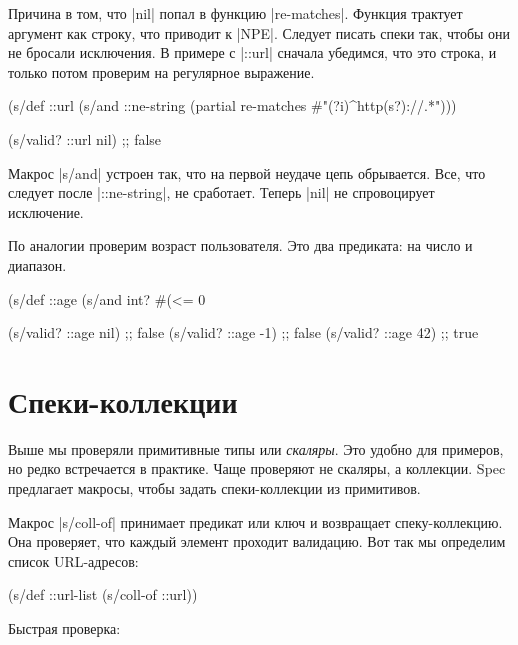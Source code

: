Причина в том, что \spverb|nil| попал в функцию \spverb|re-matches|. Функция
трактует аргумент как строку, что приводит к \spverb|NPE|. Следует писать спеки
так, чтобы они не бросали исключения. В примере с \spverb|::url| сначала
убедимся, что это строка, и только потом проверим на регулярное выражение.

\begin{english}
  \begin{clojure}
(s/def ::url
  (s/and ::ne-string
         (partial re-matches #"(?i)^http(s?)://.*")))

(s/valid? ::url nil) ;; false
  \end{clojure}
\end{english}

Макрос \spverb|s/and| устроен так, что на первой неудаче цепь обрывается. Все,
что следует после \spverb|::ne-string|, не сработает. Теперь \spverb|nil| не
спровоцирует исключение.

По аналогии проверим возраст пользователя. Это два предиката: на число и
диапазон.

\begin{english}
  \begin{clojure}
(s/def ::age
  (s/and int? #(<= 0 %

(s/valid? ::age nil) ;; false
(s/valid? ::age -1)  ;; false
(s/valid? ::age 42)  ;; true
  \end{clojure}
\end{english}

\section{Спеки-коллекции}

Выше мы проверяли примитивные типы или \emph{скаляры}. Это удобно для примеров,
но редко встречается в практике. Чаще проверяют не скаляры, а коллекции. Spec
предлагает макросы, чтобы задать спеки-коллекции из примитивов.

Макрос \spverb|s/coll-of| принимает предикат или ключ и возвращает
спеку-коллекцию. Она проверяет, что каждый элемент проходит валидацию. Вот так
мы определим список URL-адресов:

\begin{english}
  \begin{clojure}
(s/def ::url-list (s/coll-of ::url))
  \end{clojure}
\end{english}

\noindent
Быстрая проверка:

